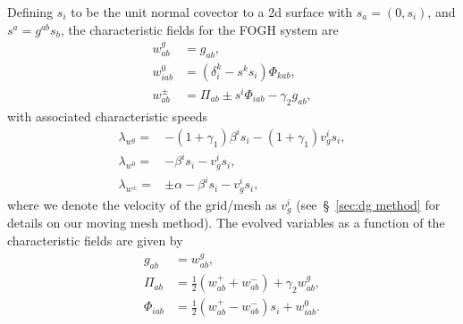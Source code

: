 \begin{bibunit}[unsrtnat]
Defining $s_i$ to be the unit normal covector to a 2d surface with
$s_a=(0,s_i)$, and $s^a=g^{ab}s_b$, the characteristic fields for the FOGH
system are~\cite{Lindblom:2005qh}
\begin{align}
  \label{eq:fosh gh w g}
  w^{g}_{ab} &= g_{ab}, \\
  \label{eq:fosh gh w 0}
  w^{0}_{iab} &= (\delta^k_i-s^k s_i)\Phi_{kab}, \\
  \label{eq:fosh gh w pm}
  w^{\pm}_{ab} &= \Pi_{ab}\pm s^i\Phi_{iab} -\gamma_2 g_{ab},
\end{align}
with associated characteristic speeds
\begin{align}
  \label{eq:fosh gh char speed g}
  \lambda_{w^g} =& -(1+\gamma_1)\beta^i s_i -(1+\gamma_1)v^i_g s_i, \\
  \label{eq:fosh gh char speed 0}
  \lambda_{w^0} =& -\beta^i s_i -v^i_g s_i, \\
  \label{eq:fosh gh char speed pm}
  \lambda_{w^\pm} =& \pm \alpha - \beta^i s_i - v^i_g s_i,
\end{align}
where we denote the velocity of the grid/mesh as $v^i_g$ (see~\S~\ref{sec:dg
  method} for details on our moving mesh method). The evolved variables as a
function of the characteristic fields are given by
\begin{align}
  \label{eq:fosh gh metric from char}
  g_{ab} &= w^g_{ab}, \\
  \label{eq:fosh gh pi from char}
  \Pi_{ab} &= \frac{1}{2}\left(w^+_{ab} + w^-_{ab}\right)+\gamma_2 w^g_{ab}, \\
  \label{eq:fosh gh phi from char}
  \Phi_{iab} &= \frac{1}{2}\left(w^+_{ab} - w^-_{ab}\right)s_i + w^0_{iab}.
\end{align}


\end{bibunit}
